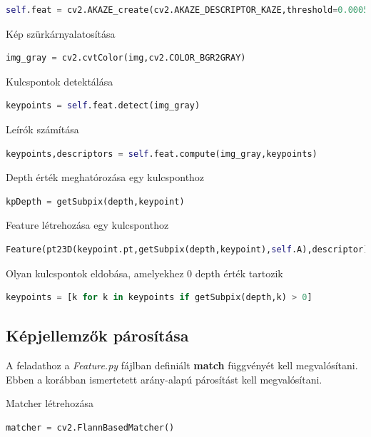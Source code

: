 \documentclass[12pt,a4paper,oneside]{report}             %
\begin{document}
\begin{lstlisting}[language=Python]
self.feat = cv2.AKAZE_create(cv2.AKAZE_DESCRIPTOR_KAZE,threshold=0.0005)
\end{lstlisting}

Kép szürkárnyalatosítása

\begin{lstlisting}[language=Python]
img_gray = cv2.cvtColor(img,cv2.COLOR_BGR2GRAY)
\end{lstlisting}

Kulcspontok detektálása

\begin{lstlisting}[language=Python]
keypoints = self.feat.detect(img_gray)
\end{lstlisting}

Leírók számítása

\begin{lstlisting}[language=Python]
keypoints,descriptors = self.feat.compute(img_gray,keypoints)
\end{lstlisting}

Depth érték meghatórozása egy kulcsponthoz

\begin{lstlisting}[language=Python]
kpDepth = getSubpix(depth,keypoint)
\end{lstlisting}

Feature létrehozása egy kulcsponthoz

\begin{lstlisting}[language=Python]
Feature(pt23D(keypoint.pt,getSubpix(depth,keypoint),self.A),descriptor)
\end{lstlisting}

Olyan kulcspontok eldobása, amelyekhez $0$ depth érték tartozik

\begin{lstlisting}[language=Python]
keypoints = [k for k in keypoints if getSubpix(depth,k) > 0]
\end{lstlisting}

\subsection{Képjellemzők párosítása}

A feladathoz a \emph{Feature.py} fájlban definiált \textbf{match} függvényét kell megvalósítani. Ebben a korábban ismertetett arány-alapú párosítást kell megvalósítani.

Matcher létrehozása

\begin{lstlisting}[language=Python]
matcher = cv2.FlannBasedMatcher()
\end{lstlisting}
\end{document}

